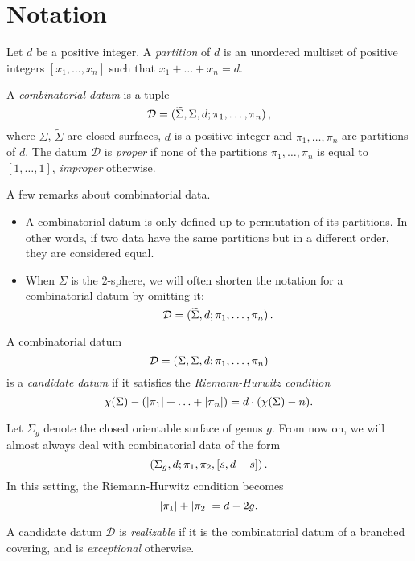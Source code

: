 \documentclass{article}
\begin{document}
\section{Notation}
\begin{definition}
Let $d$ be a positive integer. A \emph{partition} of $d$ is an unordered multiset of positive integers $[x_1,\ldots,x_n]$ such that $x_1+\ldots+x_n=d$.
\end{definition}
\begin{definition}
A \emph{combinatorial datum} is a tuple
\[
\mathcal{D}=\datum{\widetilde{\Sigma},\Sigma,d}{\pi_1,\ldots,\pi_n},
\]
where $\Sigma$, $\widetilde\Sigma$ are closed surfaces, $d$ is a positive integer and $\pi_1,\ldots,\pi_n$ are partitions of $d$. The datum $\mathcal{D}$ is \emph{proper} if none of the partitions $\pi_1,\ldots,\pi_n$ is equal to $[1,\ldots,1]$, \emph{improper} otherwise.
\end{definition}

A few remarks about combinatorial data.
\begin{itemize}
\item A combinatorial datum is only defined up to permutation of its partitions. In other words, if two data have the same partitions but in a different order, they are considered equal.
\item When $\Sigma$ is the $2$-sphere, we will often shorten the notation for a combinatorial datum by omitting it:
\[
\mathcal{D}=\datum{\widetilde\Sigma,d}{\pi_1,\ldots,\pi_n}.
\]
\end{itemize}

\begin{definition}
A combinatorial datum
\[
\mathcal{D}=\datum{\widetilde\Sigma,\Sigma,d}{\pi_1,\ldots,\pi_n}
\]
is a \emph{candidate datum} if it satisfies the \emph{Riemann-Hurwitz condition}
\[
\chi(\widetilde\Sigma)-\left(\card{\pi_1}+\ldots+\card{\pi_n}\right)=d\cdot(\chi(\Sigma)-n).
\]
\end{definition}

Let $\Sigma_g$ denote the closed orientable surface of genus $g$. From now on, we will almost always deal with combinatorial data of the form
\[
\left(\Sigma_g,d;\pi_1,\pi_2,[s,d-s]\right).
\]
In this setting, the Riemann-Hurwitz condition becomes
\begin{equation}\label{eq:rh-n3}
\left|\pi_1\right|+\left|\pi_2\right|=d-2g.
\end{equation}

\begin{definition}
A candidate datum $\mathcal{D}$ is \emph{realizable} if it is the combinatorial datum of a branched covering, and is \emph{exceptional} otherwise.
\end{definition}
\end{document}
